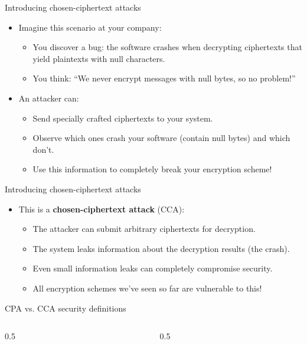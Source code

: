 \ifdefined\PRESENTATION\else\PassOptionsToClass{handout}{beamer}\fi\documentclass[aspectratio=169, lualatex]{beamer}
\begin{document}
\begin{frame}{Introducing chosen-ciphertext attacks}
	\begin{itemize}
		\item Imagine this scenario at your company:
		      \begin{itemize}
			      \item You discover a bug: the software crashes when decrypting ciphertexts that yield plaintexts with null characters.
			      \item You think: ``We never encrypt messages with null bytes, so no problem!''
		      \end{itemize}
		\item An attacker can:
		      \begin{itemize}
			      \item Send specially crafted ciphertexts to your system.
			      \item Observe which ones crash your software (contain null bytes) and which don't.
			      \item Use this information to completely break your encryption scheme!
		      \end{itemize}
	\end{itemize}
\end{frame}

\begin{frame}{Introducing chosen-ciphertext attacks}
	\begin{itemize}
		\item This is a \textbf{chosen-ciphertext attack} (CCA):
		      \begin{itemize}
			      \item The attacker can submit arbitrary ciphertexts for decryption.
			      \item The system leaks information about the decryption results (the crash).
			      \item Even small information leaks can completely compromise security.
			      \item All encryption schemes we've seen so far are vulnerable to this!
		      \end{itemize}
	\end{itemize}
\end{frame}

\begin{frame}{CPA vs. CCA security definitions}
	\begin{columns}[c]
		\begin{column}{0.5\textwidth}
		\end{column}
		\begin{column}{0.5\textwidth}
		\end{column}
	\end{columns}
\end{frame}
\end{document}
